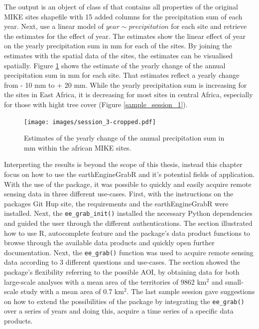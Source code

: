 The output is an object of class sf that contains all properties of the original MIKE sites shapefile with 15 added columns for the precipitation sum of each year.
Next, use a linear model of $year  \sim precipitation$ for each site and retrieve the estimates for the effect of year. 
The estimates show the linear effect of year on the yearly precipitation sum in mm for each of the sites. 
By joining the estimates with the spatial data of the sites, the estimates can be visualised spatially. 
Figure \ref{change} shows the estimate of the yearly change of the annual precipitation sum in mm for each site. That estimates reflect a yearly change from - 10 mm to + 20 mm. While the yearly precipitation sum is increasing for the sites in East Africa, it is decreasing for most sites in central Africa, especially for those with hight tree cover (Figure \ref*{sample_session_1}).

\begin{center}
	\begin{figure}[h]
		\begin{center}
			\texttt{[image: images/session\_3-cropped.pdf]}
			\caption{Estimates of the yearly change of the annual precipitation sum in mm within the african MIKE sites.}
			\label{change}
		\end{center}
	\end{figure}
\end{center}



Interpreting the results is beyond the scope of this thesis, instead this chapter focus on how to use the earthEngineGrabR and it's potential fields of application.
With the use of the package, it was possible to quickly and easily acquire remote sensing data in three different use-cases. First, with the instructions on the packages Git Hup site, the requirements and the earthEngineGrabR were installed. Next, the \texttt{ee\_grab\_init()} installed the necessary Python dependencies and guided the user through the different authentications. The section illustrated how to use R, autocomplete feature and the package's data product functions to browse through the available data products and quickly open further documentation. Next, the \texttt{ee\_grab()} function was used to acquire remote sensing data according to 3 different questions and use-cases. The section showed the package's flexibility referring to the possible AOI, by obtaining data for both large-scale analyses with a mean area of the territories of 9862 km$^2$ and small-scale study with a mean area of 0.7 km$^2$.
The last sample session gave suggestions on how to extend the possibilities of the package by integrating the \texttt{ee\_grab()} over a series of years and doing this, acquire a time series of a specific data products.




